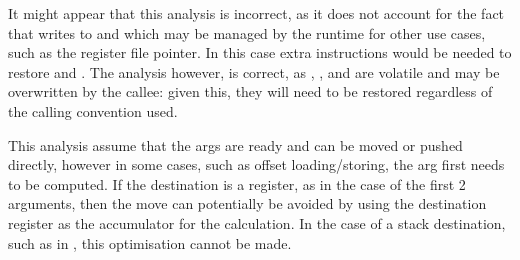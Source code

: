 It might appear that this analysis is incorrect, as it does not account for the fact that  writes to  and  which may be managed by the runtime for other use cases, such as the register file pointer. In this case extra instructions would be needed to restore  and . The analysis however, is correct, as , , and  are volatile \cite{msvc-registers} and may be overwritten by the callee: given this, they will need to be restored regardless of the calling convention used.

This analysis assume that the args are ready and can be moved or pushed directly, however in some cases, such as offset loading/storing, the arg first needs to be computed. If the destination is a register, as in the case of the first 2  arguments, then the move can potentially be avoided by using the destination register as the accumulator for the calculation. In the case of a stack destination, such as in , this optimisation cannot be made.
